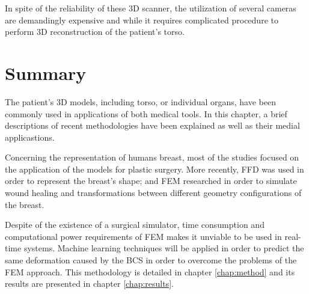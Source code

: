 In spite of the reliability of these 3D scanner, the utilization of several cameras are demandingly expensive and while it requires complicated procedure to perform 3D reconstruction of the patient's torso.

\section{Summary}

The patient's 3D models, including torso, or individual organs, have been commonly used in applications of both medical tools. In this chapter, a brief descriptions of recent methodologies have been explained as well as their medial applicastions.

Concerning the representation of humans breast, most of the studies focused on the application of the models for plastic surgery. More recently, FFD was used in order to represent the breast's shape; and FEM researched in order to simulate wound healing and transformations between different geometry configurations of the breast.

Despite of the existence of a surgical simulator, time consumption and computational power requirements of FEM makes it unviable to be used in real-time systems. Machine learning techniques will be applied in order to predict the same deformation caused by the BCS in order to overcome the problems of the FEM approach. This methodology is detailed in chapter \ref{chap:method} and its results are presented in chapter \ref{chap:results}.
